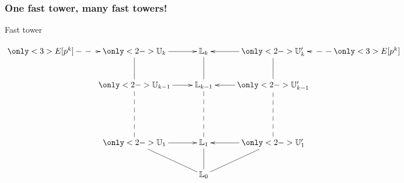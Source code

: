 \documentclass[10pt,usepdftitle=false]{beamer}
\begin{document}
\begin{frame}
  \frametitle{One fast tower, many fast towers!}
  
  \begin{center}
    Fast tower

    \smallskip

    \large$\xymatrix{
      \only<3>{E[p^k]\ar@{-->}[r]} & \only<2->{\U_k \ar@{-}[d]\ar[r]}      & \LK_k \ar@{-}[d]      & \only<2->{\U_k' \ar@{-}[d]\ar[l]}& \only<3>{E[p^k]\ar@{-->}[l]}\\
      &\only<2->{\U_{k-1} \ar@{--}[dd]\ar[r]} & \LK_{k-1} \ar@{--}[dd] & \only<2->{\U_{k-1}' \ar@{--}[dd]\ar[l]}\\
      \\
      &\only<2->{\U_1 \ar@{-}[dr]\ar[r]}     & \LK_1 \ar@{-}[d]      & \only<2->{\U_1' \ar@{-}[dl]\ar[l]}\\
      &                    &\LK_0
    }$
  \end{center}

\end{frame}

\end{document}
